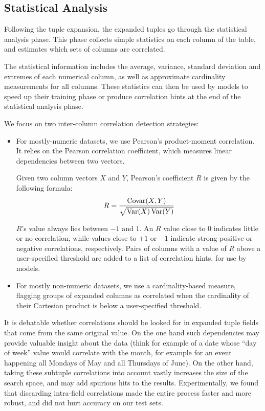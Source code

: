 \subsection{Statistical Analysis}
\label{sec:statistical-analysis}

Following the tuple expansion, the expanded tuples go through the statistical analysis phase. This phase collects simple statistics on each column of the table, and estimates which sets of columns are correlated.

The statistical information includes the average, variance, standard deviation and extremes of each numerical column, as well as approximate cardinality measurements for all columns. These statistics can then be used by models to speed up their training phase or  produce correlation hints at the end of the statistical analysis phase.

We focus on two inter-column correlation detection strategies:

\begin{itemize}
\item For mostly-numeric datasets, we use Pearson's product-moment
  correlation. It relies on the Pearson correlation coefficient,
  which measures linear dependencies between two vectors.

  Given two column vectors $X$ and $Y$, Pearson's coefficient $R$ is given by the following formula:
  \begin{align}
    \label{eqn:pearson}
    R = \frac{\operatorname{Covar}(X,Y)}{\sqrt{\operatorname{Var}(X)\operatorname{Var}(Y)}}
  \end{align}

  $R$'s value always lies between $-1$ and $1$. An $R$ value close to 0 indicates little or no correlation, while values close to $+1$ or $-1$ indicate strong positive or negative correlations, respectively. Pairs of columns with a value of \(R\) above a user-specified threshold are added to a list of correlation hints, for use by models.
\item For mostly non-numeric datasets, we use a cardinality-based measure, flagging groups of expanded columns as correlated when the cardinality of their Cartesian product is below a user-specified threshold.
\end{itemize}

It is debatable whether correlations should be looked for in expanded tuple fields that come from the same original value. On the one hand such dependencies may provide valuable insight about the data (think for example of a date whose ``day of week'' value would correlate with the month, for example for an event happening all Mondays of May and all Thursdays of June). On the other hand, taking these subtuple correlations into account vastly increases the size of the search space, and may add spurious hits to the results. Experimentally, we found that discarding intra-field correlations made the entire process faster and more robust, and did not hurt accuracy on our test sets.

